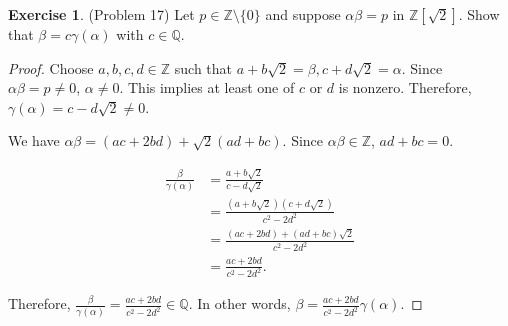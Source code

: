 \documentclass[12pt, psamsfonts]{amsart}
\theoremstyle{definition}
\newtheorem*{exer}{Exercise}
\theoremstyle{remark}
\numberwithin{equation}{section}
\begin{document}
\begin{exer}{(Problem 17)}
  Let $p \in \mathbb{Z} \setminus \{ 0 \}$ and suppose $\alpha\beta = p$ in $\mathbb{Z}[\sqrt{2}]$.
  Show that $\beta = c\gamma(\alpha)$ with $c \in \mathbb{Q}$.
\end{exer}

\begin{proof}
  Choose $a, b, c, d \in \mathbb{Z}$ such that $a + b\sqrt{2} = \beta, c + d\sqrt{2} = \alpha$.
  Since $\alpha\beta = p \ne 0$, $\alpha \ne 0$.
  This implies at least one of $c$ or $d$ is nonzero.
  Therefore, $\gamma(\alpha) = c - d\sqrt{2} \ne 0$.

  We have $\alpha\beta = (ac + 2bd) + \sqrt{2}(ad + bc)$.
  Since $\alpha\beta \in \mathbb{Z}$, $ad + bc = 0$.

  \begin{align*}
    \frac{\beta}{\gamma(\alpha)}
      &= \frac{a + b\sqrt{2}}{c - d\sqrt{2}} \\
      &= \frac{(a + b\sqrt{2})(c + d\sqrt{2})}{c^2 - 2d^2} \\
      &= \frac{(ac + 2bd) + (ad + bc)\sqrt{2}}{c^2 - 2d^2} \\
      &= \frac{ac + 2bd}{c^2 - 2d^2}.
  \end{align*}

  Therefore, $\frac{\beta}{\gamma(\alpha)}  = \frac{ac + 2bd}{c^2 - 2d^2} \in \mathbb{Q}$.
  In other words, $\beta = \frac{ac + 2bd}{c^2 - 2d^2}\gamma(\alpha)$.
\end{proof}
\end{document}
